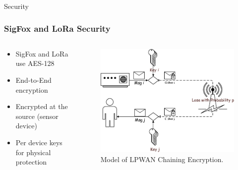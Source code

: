 \documentclass{beamer}
\begin{document}
  \begin{frame}{Security}
    \frametitle{SigFox and LoRa Security}
    \begin{columns}
      \begin{column}{0.5\textwidth}
        \begin{itemize}
          \item SigFox and LoRa use AES-128
          \item End-to-End encryption
          \item Encrypted at the source (sensor device)
          \item Per device keys for physical protection
        \end{itemize}
      \end{column}
      \begin{column}{0.5\textwidth}
        \begin{figure}[htbp]
          \centering
          \includegraphics[width=\textwidth]{Model-of-LPWAN-Chaining-Encryption.png}
          \caption{Model of LPWAN Chaining Encryption.\cite{bidgoly2019novel}}
          \label{fig:LPWAN_encryption}
        \end{figure}
      \end{column}
    \end{columns}
  \end{frame}
\end{document}
